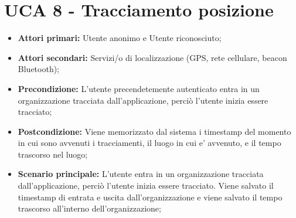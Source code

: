 \section{UCA 8 - Tracciamento posizione}%
\begin{itemize}
\item \textbf{Attori primari:} Utente anonimo e Utente riconosciuto;
\item \textbf{Attori secondari:} Servizi/o di localizzazione (GPS, rete cellulare, beacon Bluetooth);
\item \textbf{Precondizione:} L'utente precendetemente autenticato entra in un organizzazione tracciata dall'applicazione, perciò l'utente inizia essere tracciato;
\item \textbf{Postcondizione:} Viene memorizzato dal sistema i timestamp del momento in cui sono avvenuti i tracciamenti, il luogo in cui e’ avvenuto, e il tempo trascorso nel luogo;
\item \textbf{Scenario principale:} L'utente entra in un organizzazione tracciata dall'applicazione, perciò l'utente inizia essere tracciato. Viene salvato il timestamp di entrata e uscita dall'organizzazione e viene salvato il tempo trascorso all'interno dell'organizzazione;
\end{itemize}

